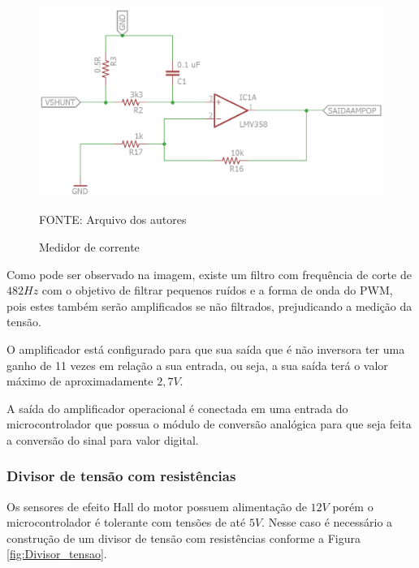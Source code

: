 \documentclass[
	12pt,				%
	openany,			%
	twoside,			%
	a4paper,			%
	english,			%
	french,				%
	spanish,			%
	brazil,				%
	oldfontcommands
	]{abntex2}
\begin{document}
\begin{figure}[th]
	\caption{Medidor de corrente}
	\centering
	\includegraphics[width=1\linewidth]{./figs/Medidor_corrente_motores}
	
	\begin{small}
		FONTE: Arquivo dos autores
	\end{small}
	\label{fig:Medidor_corrente}
\end{figure}

\newpage

Como pode ser observado na imagem, existe um filtro com frequência de corte de $482Hz$ com o objetivo de filtrar pequenos ruídos e a forma de onda do PWM, pois estes também serão amplificados se não filtrados, prejudicando a medição da tensão.

O amplificador está configurado para que sua saída que é não inversora ter uma ganho de 11 vezes em relação a sua entrada, ou seja, a sua saída terá o valor máximo de aproximadamente $2,7V$.

A saída do amplificador operacional é conectada em uma entrada do microcontrolador que possua o módulo de conversão analógica para que seja feita a conversão do sinal para valor digital.  

\subsubsection{Divisor de tensão com resistências}

Os sensores de efeito Hall do motor possuem alimentação de $12V$ porém o microcontrolador é tolerante com tensões de até $5V$. Nesse caso é necessário a construção de um divisor de tensão com resistências  conforme a Figura \ref{fig:Divisor_tensao}. 
\end{document}
